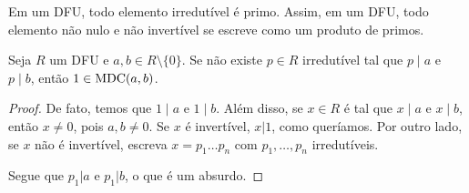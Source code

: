 \begin{corol}\label{corol:DFUprime}
Em um DFU, todo elemento irredutível é primo.
Assim, em um DFU, todo elemento não nulo e não invertível se escreve como um produto de primos.
\end{corol}

\begin{lemma}
    Seja $R$ um DFU e $a, b \in R\setminus \{0\}$.
    Se não existe $p \in R$ irredutível tal que $p\mid a$ e $p\mid b$, então $1 \in \operatorname{MDC}(a, b)$.
\end{lemma}

\begin{proof}
    De fato, temos que $1\mid a$ e $1\mid b$. Além disso, se $x\in R$ é tal que $x\mid a$ e $x\mid b$, então $x\neq 0$, pois $a, b \neq 0$. Se $x$ é invertível, $x|1$, como queríamos. Por outro lado, se $x$ não é invertível, escreva $x=p_1\dots p_n$ com $p_1, \dots, p_n$ irredutíveis.

    Segue que $p_1|a$ e $p_1|b$, o que é um absurdo.
\end{proof}

